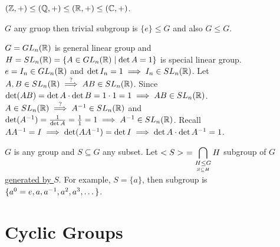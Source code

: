 \documentclass[]{article}
\begin{document}
\begin{example}
	$(\mathbb{Z},+)\leq (\mathbb{Q},+)\leq(\mathbb{R},+)\leq(\mathbb{C},+)$.
\end{example}
\begin{example}
	$G$ any gruop then trivial subgroup is $\{e\}\leq G$ and also $G\leq G$.
\end{example}
\begin{example}
	$G = GL_n(\mathbb{R})$ is general linear group and $H = SL_n(\mathbb{R}) = \{A\in GL_n(\mathbb{R}) \mid \det A = 1\}$ is special linear group.
	$e = I_n\in GL_n(\mathbb{R})$ and $\det I_n = 1 \implies I_n\in SL_n(\mathbb{R})$.
	Let $A,B\in SL_n(\mathbb{R}) \overset{?}{\implies} AB\in SL_n(\mathbb{R})$. Since $\det(AB) = \det A \cdot \det B = 1\cdot 1 = 1 \implies AB\in SL_n(\mathbb{R})$.
	$A\in SL_n(\mathbb{R}) \overset{?}{\implies} A^{-1}\in SL_n(\mathbb{R})$ and $\det(A^{-1}) = \frac{1}{\det A} = \frac{1}{1} = 1\implies A^{-1}\in SL_n(\mathbb{R})$. Recall $AA^{-1} = I \implies \det(AA^{-1}) = \det I \implies \det A\cdot \det A^{-1} = 1$.
\end{example}
\begin{example}
	$G$ is any group and $S\subseteq G$ any subset.
	Let $\displaystyle < S >\ = \bigcap_{\underset{S\subseteq H}{H\leq G}} H$ subgroup of $G$ \ul{generated by $S$}. For example, $S = \{a\}$, then subgroup is $\{a^0=e,a,a^{-1},a^2,a^3,\dots\}$.
\end{example}

\section{Cyclic Groups}
\end{document}
